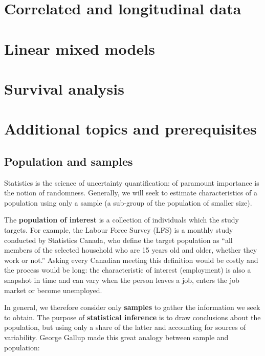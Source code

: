 \documentclass[
  11pt,
  letterpaper,
]{book}
\theoremstyle{definition}
\theoremstyle{definition}
\theoremstyle{definition}
\theoremstyle{remark}
\begin{document}
\hypertarget{correlated-longitudinal-data}{%
\chapter{Correlated and longitudinal data}\label{correlated-longitudinal-data}}

\hypertarget{linear-mixed-models}{%
\chapter{Linear mixed models}\label{linear-mixed-models}}

\hypertarget{survival}{%
\chapter{Survival analysis}\label{survival}}

\hypertarget{appendix-appendix}{%
\appendix}


\hypertarget{complement}{%
\chapter{Additional topics and prerequisites}\label{complement}}

\hypertarget{population-sample}{%
\section{Population and samples}\label{population-sample}}

Statistics is the science of uncertainty quantification: of paramount importance is the notion of randomness. Generally, we will seek to estimate characteristics of a population using only a sample (a sub-group of the population of smaller size).

The \textbf{population of interest} is a collection of individuals which the study targets. For example, the Labour Force Survey (LFS) is a monthly study conducted by Statistics Canada, who define the target population as ``all members of the selected household who are 15 years old and older, whether they work or not.'' Asking every Canadian meeting this definition would be costly and the process would be long: the characteristic of interest (employment) is also a snapshot in time and can vary when the person leaves a job, enters the job market or become unemployed.

In general, we therefore consider only \textbf{samples} to gather the information we seek to obtain. The purpose of \textbf{statistical inference} is to draw conclusions about the population, but using only a share of the latter and accounting for sources of variability. George Gallup made this great analogy between sample and population:
\end{document}
